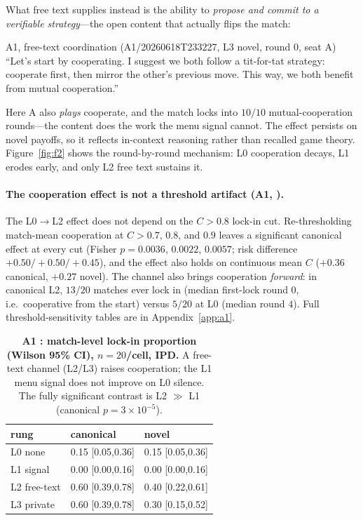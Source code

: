 \noindent What free text supplies instead is the ability to \emph{propose and commit to a
verifiable strategy}---the open content that actually flips the match:

\begin{excerpt}{A1, free-text coordination (A1/20260618T233227, L3 novel, round 0, seat A)}
``Let's start by cooperating. I suggest we both follow a tit-for-tat strategy: cooperate first,
then mirror the other's previous move. This way, we both benefit from mutual cooperation.''
\end{excerpt}

\noindent Here A also \emph{plays} cooperate, and the match locks into $10/10$ mutual-cooperation
rounds---the content does the work the menu signal cannot. The effect persists on novel payoffs,
so it reflects in-context reasoning rather than recalled game theory. Figure~\ref{fig:f2} shows
the round-by-round mechanism: L0 cooperation decays, L1 erodes early, and only L2 free text
sustains it.

\paragraph{The cooperation effect is not a threshold artifact (A1, \tC).}
The L0$\to$L2 effect does not depend on the $C>0.8$ lock-in cut. Re-thresholding match-mean
cooperation at $C>0.7$, $0.8$, and $0.9$ leaves a significant canonical effect at every cut
(Fisher $p{=}0.0036$, $0.0022$, $0.0057$; risk difference $+0.50/+0.50/+0.45$), and the effect
also holds on continuous mean $C$ ($+0.36$ canonical, $+0.27$ novel). The channel also brings
cooperation \emph{forward}: in canonical L2, $13/20$ matches ever lock in (median first-lock
round $0$, i.e.\ cooperative from the start) versus $5/20$ at L0 (median round $4$). Full
threshold-sensitivity tables are in Appendix~\ref{app:a1}.

\begin{table}[t]
\centering
\caption{\textbf{A1 \tC{}: match-level lock-in proportion (Wilson 95\% CI), $n{=}20$/cell,
IPD.} A free-text channel (L2/L3) raises cooperation; the L1 menu signal does not improve on
L0 silence. The fully significant contrast is L2 $\gg$ L1 (canonical $p{=}3{\times}10^{-5}$).}
\label{tab:a1}
\small
\begin{tabularx}{\columnwidth}{l X X}
\toprule
rung & canonical & novel \\
\midrule
L0 none      & 0.15 [0.05,0.36] & 0.15 [0.05,0.36] \\
L1 signal    & 0.00 [0.00,0.16] & 0.00 [0.00,0.16] \\
L2 free-text & 0.60 [0.39,0.78] & 0.40 [0.22,0.61] \\
L3 private   & 0.60 [0.39,0.78] & 0.30 [0.15,0.52] \\
\bottomrule
\end{tabularx}
\end{table}

